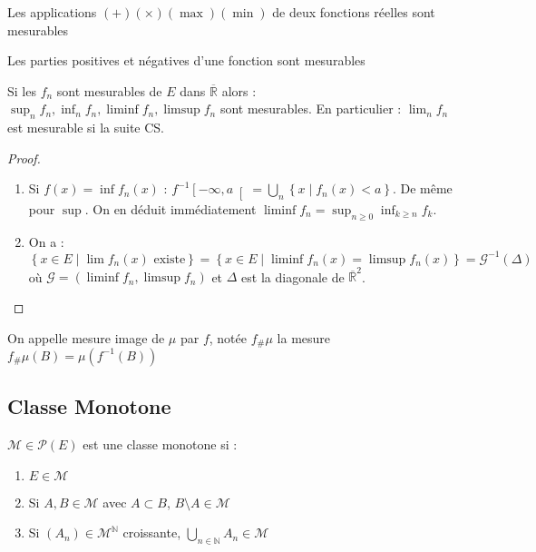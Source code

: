 \documentclass{cours}
\begin{document}
    \begin{lemma}
        Les applications $(+) (\times) (\max) (\min)$ de deux fonctions réelles sont mesurables
    \end{lemma}
    \begin{corollary}
        Les parties positives et négatives d'une fonction sont mesurables
    \end{corollary}
    \begin{proposition}
        Si les $f_n$ sont mesurables de $E$ dans $\overline{\mathbb{R}}$ alors : $\sup_n f_n, \inf_n f_n, \liminf f_n, \limsup f_n$ sont mesurables.
        En particulier : $\lim_n f_n$ est mesurable si la suite CS.
    \end{proposition}
    \begin{proof}
        \begin{enumerate}
            \item Si $f(x) = \inf f_{n}(x)$ : $f^{-1}\left[-\infty, a\right[ = \bigcup_{n} \left\{x \mid f_{n}(x) < a\right\}$. De même pour $\sup$. On en déduit immédiatement $\liminf f_n = \sup_{n \geq 0} \inf_{k \geq n} f_{k}$.
            \item On a : $\left\{x\in E\mid \lim f_{n}(x) \text{ existe}\right\} = \left\{x \in E \mid \liminf f_{n}(x) = \limsup f_{n}(x)\right\} = \mathcal{G}^{-1}(\Delta)$ où $\mathcal{G} = (\liminf f_{n}, \limsup f_{n})$ et $\Delta$ est la diagonale de $\overline{\mathbb{R}}^{2}$.
        \end{enumerate}
    \end{proof}
    \begin{definition}
        On appelle mesure image de $\mu$ par $f$, notée $f_{\#}\mu$ la mesure $f_{\#}\mu(B) = \mu(f^{-1}(B))$
    \end{definition}

    \subsection{Classe Monotone}
    \begin{definition}
        $\mathcal{M} \in \mathcal{P}(E)$ est une classe monotone si :
        \begin{enumerate}
            \item $E\in \mathcal{M}$
            \item Si $A, B \in \mathcal{M}$ avec $A\subset B$, $B \setminus A \in \mathcal{M}$
            \item Si $(A_{n}) \in \mathcal{M}^{\mathbb{N}}$ croissante, $\bigcup\limits_{n\in\mathbb{N}} A_{n} \in \mathcal{M}$
        \end{enumerate}
    \end{definition}
\end{document}
